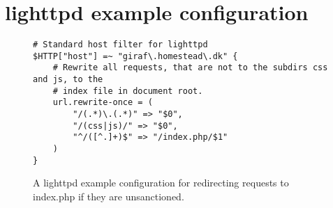 \section{lighttpd example configuration}
\label{appendix_server_conf}
\begin{figure}
\begin{verbatim}
# Standard host filter for lighttpd
$HTTP["host"] =~ "giraf\.homestead\.dk" {
    # Rewrite all requests, that are not to the subdirs css and js, to the
    # index file in document root.
	url.rewrite-once = (
		"/(.*)\.(.*)" => "$0",
		"/(css|js)/" => "$0",
		"^/([^.]+)$" => "/index.php/$1"
	)
}
\end{verbatim}
\caption{A lighttpd example configuration for redirecting requests to index.php if they are unsanctioned.}
\end{figure}
